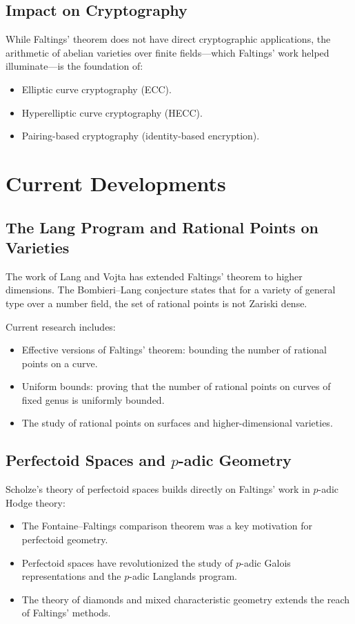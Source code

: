 \subsection{Impact on Cryptography}

While Faltings' theorem does not have direct cryptographic applications, the arithmetic of abelian varieties over finite fields---which Faltings' work helped illuminate---is the foundation of:
\begin{itemize}
\item Elliptic curve cryptography (ECC).
\item Hyperelliptic curve cryptography (HECC).
\item Pairing-based cryptography (identity-based encryption).
\end{itemize}

\section{Current Developments}

\subsection{The Lang Program and Rational Points on Varieties}

The work of Lang and Vojta has extended Faltings' theorem to higher dimensions. The Bombieri--Lang conjecture states that for a variety of general type over a number field, the set of rational points is not Zariski dense.

Current research includes:
\begin{itemize}
\item Effective versions of Faltings' theorem: bounding the number of rational points on a curve.
\item Uniform bounds: proving that the number of rational points on curves of fixed genus is uniformly bounded.
\item The study of rational points on surfaces and higher-dimensional varieties.
\end{itemize}

\subsection{Perfectoid Spaces and $p$-adic Geometry}

Scholze's theory of perfectoid spaces builds directly on Faltings' work in $p$-adic Hodge theory:
\begin{itemize}
\item The Fontaine--Faltings comparison theorem was a key motivation for perfectoid geometry.
\item Perfectoid spaces have revolutionized the study of $p$-adic Galois representations and the $p$-adic Langlands program.
\item The theory of diamonds and mixed characteristic geometry extends the reach of Faltings' methods.
\end{itemize}

